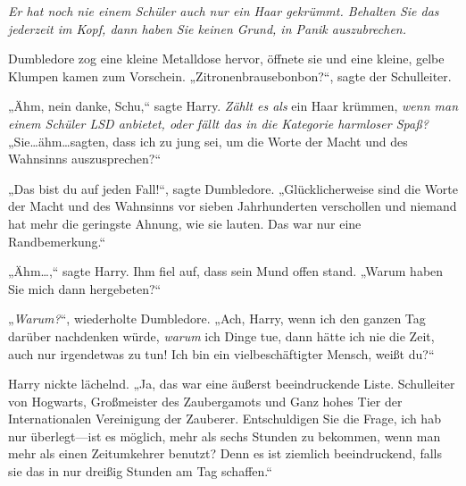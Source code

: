 \emph{Er hat noch nie einem Schüler auch nur ein Haar gekrümmt. Behalten Sie das jederzeit im Kopf, dann haben Sie keinen Grund, in Panik auszubrechen.}

Dumbledore zog eine kleine Metalldose hervor, öffnete sie und eine kleine, gelbe Klumpen kamen zum Vorschein. „Zitronenbrausebonbon?“, sagte der Schulleiter.

„Ähm, nein danke, Schu,“ sagte Harry. \emph{Zählt es als} ein Haar krümmen, \emph{wenn man einem Schüler LSD anbietet, oder fällt das in die Kategorie harmloser Spaß?} „Sie…ähm…sagten, dass ich zu jung sei, um die Worte der Macht und des Wahnsinns auszusprechen?“

„Das bist du auf jeden Fall!“, sagte Dumbledore. „Glücklicherweise sind die Worte der Macht und des Wahnsinns vor sieben Jahrhunderten verschollen und niemand hat mehr die geringste Ahnung, wie sie lauten. Das war nur eine Randbemerkung.“

„Ähm…,“ sagte Harry. Ihm fiel auf, dass sein Mund offen stand. „Warum haben Sie mich dann hergebeten?“

„\emph{Warum?}“, wiederholte Dumbledore. „Ach, Harry, wenn ich den ganzen Tag darüber nachdenken würde, \emph{warum} ich Dinge tue, dann hätte ich nie die Zeit, auch nur irgendetwas zu tun! Ich bin ein vielbeschäftigter Mensch, weißt du?“

Harry nickte lächelnd. „Ja, das war eine äußerst beeindruckende Liste. Schulleiter von Hogwarts, Großmeister des Zaubergamots und Ganz hohes Tier der Internationalen Vereinigung der Zauberer. Entschuldigen Sie die Frage, ich hab nur überlegt—ist es möglich, mehr als sechs Stunden zu bekommen, wenn man mehr als einen Zeitumkehrer benutzt? Denn es ist ziemlich beeindruckend, falls sie das in nur dreißig Stunden am Tag schaffen.“

